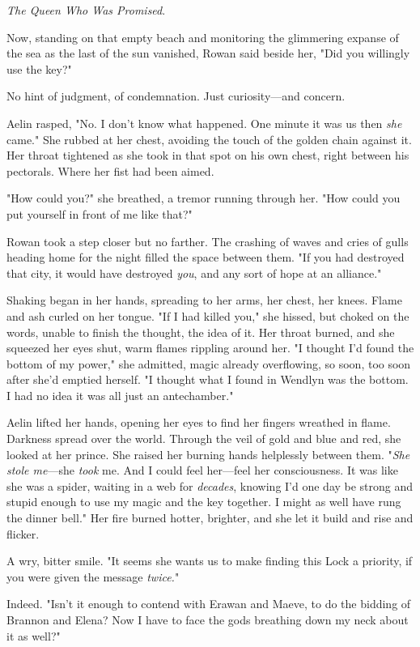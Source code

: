 \emph{The Queen Who Was Promised}.

Now, standing on that empty beach and monitoring the glimmering expanse of the sea as the last of the sun vanished, Rowan said beside her, "Did you willingly use the key?"

No hint of judgment, of condemnation. Just curiosity---and concern.

Aelin rasped, "No. I don't know what happened. One minute it was us
 then \emph{she} came." She rubbed at her chest, avoiding the touch of the golden chain against it. Her throat tightened as she took in that spot on his own chest, right between his pectorals. Where her fist had been aimed.

"How could you?" she breathed, a tremor running through her. "How could you put yourself in front of me like that?"

Rowan took a step closer but no farther. The crashing of waves and cries of gulls heading home for the night filled the space between them. "If you had destroyed that city, it would have destroyed \emph{you}, and any sort of hope at an alliance."

Shaking began in her hands, spreading to her arms, her chest, her knees. Flame and ash curled on her tongue. "If I had killed you," she hissed, but choked on the words, unable to finish the thought, the idea of it. Her throat burned, and she squeezed her eyes shut, warm flames rippling around her. "I thought I'd found the bottom of my power," she admitted, magic already overflowing, so soon, too soon after she'd emptied herself. "I thought what I found in Wendlyn was the bottom. I had no idea it was all just an  antechamber."

Aelin lifted her hands, opening her eyes to find her fingers wreathed in flame. Darkness spread over the world. Through the veil of gold and blue and red, she looked at her prince. She raised her burning hands helplessly between them. "\emph{She stole me}---she \emph{took} me. And I could feel her---feel her consciousness. It was like she was a spider, waiting in a web for \emph{decades}, knowing I'd one day be strong and stupid enough to use my magic and the key together. I might as well have rung the dinner bell." Her fire burned hotter, brighter, and she let it build and rise and flicker.

A wry, bitter smile. "It seems she wants us to make finding this Lock a priority, if you were given the message \emph{twice.}"

Indeed. "Isn't it enough to contend with Erawan and Maeve, to do the bidding of Brannon and Elena? Now I have to face the gods breathing down my neck about it as well?"

